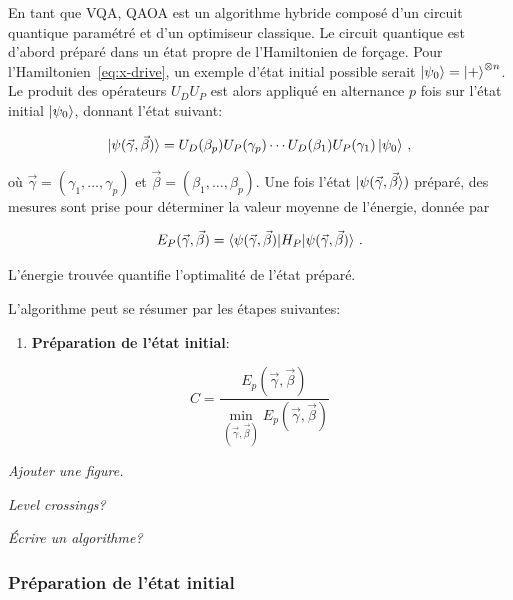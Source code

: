 En tant que VQA, QAOA est un algorithme hybride composé d'un circuit quantique paramétré et d'un optimiseur classique. Le circuit quantique est d'abord préparé dans un état propre de l'Hamiltonien de forçage. Pour l'Hamiltonien~\ref{eq:x-drive}, un exemple d'état initial possible serait $\ket{\psi_{0}} = \ket{+}^{\otimes n}$. Le produit des opérateurs $U_{D}U_{P}$ est alors appliqué en alternance $p$ fois sur l'état initial $\ket{\psi_{0}}$, donnant l'état suivant:

\begin{equation}
    \label{eq:final-state}
    \ket{\psi(\vec{\gamma}, \vec{\beta})} = U_D(\beta_p) U_P(\gamma_p) \cdots U_D(\beta_1) U_P(\gamma_1) \ket{\psi_{0}} \,,
\end{equation}

où $\vec{\gamma} = (\gamma_{1}, \dots, \gamma_{p})$ et $\vec{\beta} = (\beta_{1}, \dots, \beta_{p})$. Une fois l'état $\ket{\psi(\vec{\gamma}, \vec{\beta}})$ préparé, des mesures sont prise pour déterminer la valeur moyenne de l'énergie, donnée par

\begin{equation}
    E_{P} (\vec{\gamma}, \vec{\beta}) = \braket{ \psi(\vec{\gamma}, \vec{\beta}) | H_{P} | \psi(\vec{\gamma}, \vec{\beta}) } \,.
\end{equation}

L'énergie trouvée quantifie l'optimalité de l'état préparé.

L'algorithme peut se résumer par les étapes suivantes:

\begin{enumerate}[(1)]
    \item \textbf{Préparation de l'état initial}:
\end{enumerate}

\begin{equation}
    C = \frac{ E_{p} (\vec{\gamma}, \vec{\beta})}{\min_{(\vec{\gamma}, \vec{\beta})} E_{p} (\vec{\gamma}, \vec{\beta}) }
\end{equation}


\textcolor{mydarkred}{\textit{Ajouter une figure.}}

\textcolor{mydarkred}{\textit{Level crossings?}}

\textcolor{mydarkred}{\textit{Écrire un algorithme?}}


\subsubsection{Préparation de l'état initial}
\label{subsec:encodage-probleme}

